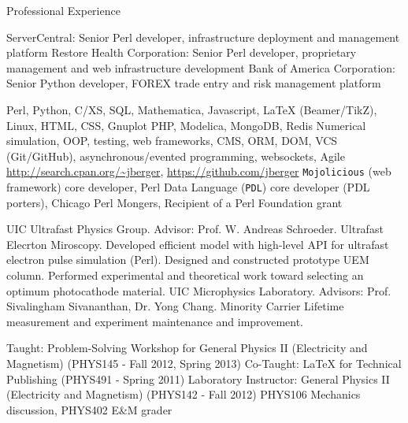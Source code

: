 \begin{rubric}{Professional Experience}


   ServerCentral: Senior Perl developer, infrastructure deployment and management platform
   Restore Health Corporation: Senior Perl developer, proprietary management and web infrastructure development
   Bank of America Corporation: Senior Python developer, FOREX trade entry and risk management platform


  \entry*[Proficient in] Perl, Python, C/XS, SQL, Mathematica, Javascript, \LaTeX{} (Beamer/TikZ), Linux, HTML, CSS, Gnuplot
   PHP, Modelica, MongoDB, Redis
  \entry*[Concepts] Numerical simulation, OOP, testing, web frameworks, CMS, ORM, DOM, VCS (Git/GitHub), asynchronous/evented programming, websockets, Agile
  \entry*[Code] \url{http://search.cpan.org/~jberger}, \url{https://github.com/jberger}
  \entry*[Affiliations] \texttt{Mojolicious} (web framework) core developer, Perl Data Language (\texttt{PDL}) core developer (PDL porters), Chicago Perl Mongers, Recipient of a Perl Foundation grant


  \entry*[2005 --- 2013] UIC Ultrafast Physics Group. Advisor: Prof. W. Andreas Schroeder. Ultrafast Elecrton Miroscopy.
  \entry* Developed efficient model with high-level API for ultrafast electron pulse simulation (Perl).
  \entry* Designed and constructed prototype UEM column.
  \entry* Performed experimental and theoretical work toward selecting an optimum photocathode material.
  \entry*[2003 --- 2005] UIC Microphysics Laboratory. Advisors: Prof. Sivalingham Sivananthan, Dr. Yong Chang.
  \entry* Minority Carrier Lifetime measurement and experiment maintenance and improvement.


  \entry*[Teaching] Taught: Problem-Solving Workshop for General Physics II (Electricity and Magnetism) (PHYS145 - Fall 2012, Spring 2013)
  \entry*[Teaching] Co-Taught: \LaTeX{} for Technical Publishing (PHYS491 - Spring 2011)
  \entry*[T.A.] Laboratory Instructor: General Physics II (Electricity and Magnetism) (PHYS142 - Fall 2012)
  \entry*[T.A.] PHYS106 Mechanics discussion, PHYS402 E\&M grader

\end{rubric}
